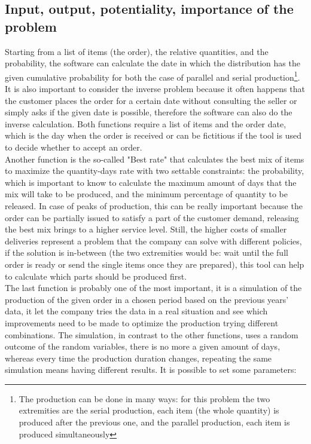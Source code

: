 \documentclass[a4paper,12pt]{article}
\begin{document}
\subsection{Input, output, potentiality, importance of the problem}
Starting from a list of items (the order), the relative quantities, and the probability, the software can calculate the date in which the distribution has the given cumulative probability for both the case of parallel and serial production\footnote{The production can be done in many ways: for this problem the two extremities are the serial production, each item (the whole quantity) is produced after the previous one, and the parallel production, each item is produced simultaneously}.  It is also important to consider the inverse problem because it often happens that the customer places the order for a certain date without consulting the seller or simply asks if the given date is possible, therefore the software can also do the inverse calculation. Both functions require a list of items and the order date, which is the day when the order is received or can be fictitious if the tool is used to decide whether to accept an order. \\
Another function is the so-called "Best rate" that calculates the best mix of items to maximize the quantity-days rate with two settable constraints: the probability, which is important to know to calculate the maximum amount of days that the mix will take to be produced, and the minimum percentage of quantity to be released. In case of peaks of production, this can be really important because the order can be partially issued to satisfy a part of the customer demand, releasing the best mix brings to a higher service level. Still, the higher costs of smaller deliveries represent a problem that the company can solve with different policies, if the solution is in-between (the two extremities would be: wait until the full order is ready or send the single items once they are prepared), this tool can help to calculate which parts should be produced first. \\
The last function is probably one of the most important, it is a simulation of the production of the given order in a chosen period based on the previous years' data, it let the company tries the data in a real situation and see which improvements need to be made to optimize the production trying different combinations. The simulation, in contrast to the other functions, uses a random outcome of the random variables, there is no more a given amount of days, whereas every time the production duration changes, repeating the same simulation means having different results. It is possible to set some parameters:
\end{document}
